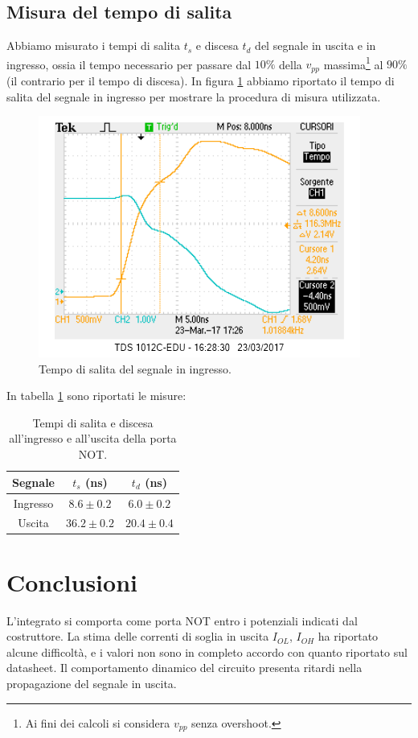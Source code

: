 \documentclass[10pt,a4paper]{article}
\begin{document}
\subsection{Misura del tempo di salita}
Abbiamo misurato i tempi di salita $t_{s}$ e discesa $t_{d}$ del segnale in uscita e in ingresso, ossia il tempo necessario per passare dal $10\%$ della $v_{pp}$ massima\footnote{Ai fini dei calcoli si considera $v_{pp}$ senza overshoot.} al $90\%$ (il contrario per il tempo di discesa).
In figura \ref{fig:tsalitain} abbiamo riportato il tempo di salita del segnale in ingresso per mostrare la procedura di misura utilizzata.
\begin{figure}[!htb]
\centering
\includegraphics[scale=0.6]{tsalitain.png}
\caption{Tempo di salita del segnale in ingresso.\label{fig:tsalitain}}
\end{figure}

In tabella \ref{tab:tempisalita} sono riportati le misure:
\begin{table}[!htb]
\centering
\begin{tabular}{|c|c|c|}
\hline
Segnale & $t_{s}$ (ns) & $t_{d}$ (ns) \\
\hline
Ingresso & $8.6 \pm 0.2$  & $6.0 \pm 0.2$  \\
\hline
Uscita & $36.2\pm 0.2$ &  $20.4\pm0.4$    \\
\hline

\end{tabular}
\caption{Tempi di salita e discesa all'ingresso e all'uscita della porta NOT.\label{tab:tempisalita}}
\end{table}
\section{Conclusioni}
L'integrato si comporta come porta NOT entro i potenziali indicati dal costruttore. La stima delle correnti di soglia in uscita $I_{OL}$, $I_{OH}$ ha riportato alcune difficoltà, e i valori non sono in completo accordo con quanto riportato sul datasheet.
Il comportamento dinamico del circuito presenta ritardi nella propagazione del segnale in uscita.
\end{document}
